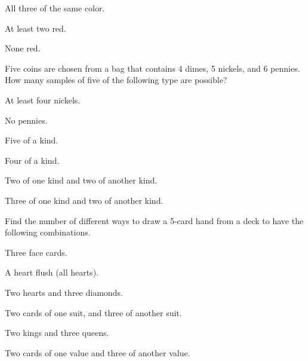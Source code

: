 \begin{puzzle}
    All three of the same color.
\end{puzzle}

\begin{puzzle}
    At least two red.
\end{puzzle}

\begin{puzzle}
    None red.
\end{puzzle}

Five coins are chosen from a bag that contains 4 dimes, 5 nickels, and 6 pennies. How many samples of five of the following type are possible?

\begin{puzzle}
    At least four nickels.
\end{puzzle}

\begin{puzzle}
    No pennies.
\end{puzzle}

\begin{puzzle}
    Five of a kind.
\end{puzzle}

\begin{puzzle}
    Four of a kind.
\end{puzzle}

\begin{puzzle}
    Two of one kind and two of another kind.
\end{puzzle}

\begin{puzzle}
    Three of one kind and two of another kind.
\end{puzzle}

Find the number of different ways to draw a 5-card hand from a deck to have the following combinations.

\begin{puzzle}
    Three face cards.
\end{puzzle}

\begin{puzzle}
    A heart flush (all hearts).
\end{puzzle}

\begin{puzzle}
    Two hearts and three diamonds.
\end{puzzle}

\begin{puzzle}
    Two cards of one suit, and three of another suit.
\end{puzzle}

\begin{puzzle}
    Two kings and three queens.
\end{puzzle}

\begin{puzzle}
    Two cards of one value and three of another value.
\end{puzzle}